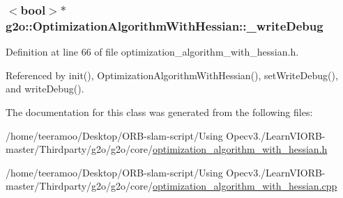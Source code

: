 \subsubsection[{\texorpdfstring{\+\_\+write\+Debug}{_writeDebug}}]{$<$bool$>$$\ast$ g2o\+::\+Optimization\+Algorithm\+With\+Hessian\+::\+\_\+write\+Debug\hspace{0.3cm}{\ttfamily [protected]}}\hypertarget{classg2o_1_1OptimizationAlgorithmWithHessian_a6dd1e4e8dc2d09233c40de02b2c9fe8c}{}\label{classg2o_1_1OptimizationAlgorithmWithHessian_a6dd1e4e8dc2d09233c40de02b2c9fe8c}


Definition at line 66 of file optimization\+\_\+algorithm\+\_\+with\+\_\+hessian.\+h.



Referenced by init(), Optimization\+Algorithm\+With\+Hessian(), set\+Write\+Debug(), and write\+Debug().



The documentation for this class was generated from the following files\+:\begin{DoxyCompactItemize}
\item 
/home/teeramoo/\+Desktop/\+O\+R\+B-\/slam-\/script/\+Using Opecv3./\+Learn\+V\+I\+O\+R\+B-\/master/\+Thirdparty/g2o/g2o/core/\hyperlink{optimization__algorithm__with__hessian_8h}{optimization\+\_\+algorithm\+\_\+with\+\_\+hessian.\+h}\item 
/home/teeramoo/\+Desktop/\+O\+R\+B-\/slam-\/script/\+Using Opecv3./\+Learn\+V\+I\+O\+R\+B-\/master/\+Thirdparty/g2o/g2o/core/\hyperlink{optimization__algorithm__with__hessian_8cpp}{optimization\+\_\+algorithm\+\_\+with\+\_\+hessian.\+cpp}\end{DoxyCompactItemize}
